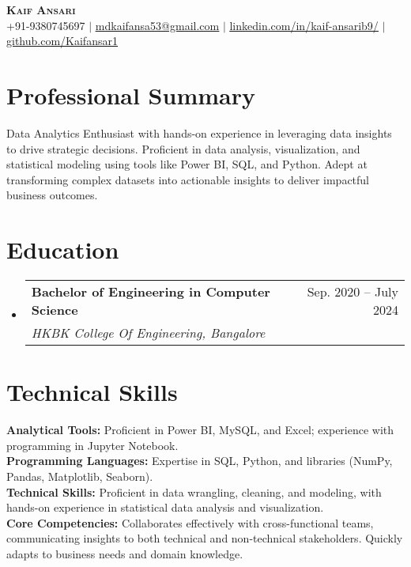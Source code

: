 \documentclass[letterpaper,11pt]{article}
\makeatletter
\newcommand{\resumeSubheading}[4]{
  \vspace{-2pt}\item
    \begin{tabular*}{0.97\textwidth}[t]{l@{\extracolsep{\fill}}r}
      \textbf{#1} & #2 \\
      \textit{\small#3} & \textit{\small #4} \\
    \end{tabular*}\vspace{-7pt}
}
\newcommand{\resumeSubHeadingListStart}{\begin{itemize}[leftmargin=0.15in, label={}]}
\newcommand{\resumeSubHeadingListEnd}{\end{itemize}}
\makeatother
\begin{document}
\begin{center}
    \textbf{\Huge \scshape Kaif Ansari} \\ \vspace{1pt}
    \small +91-9380745697 $|$ \href{mailto:mdkaifansa53@gmail.com}{\underline{mdkaifansa53@gmail.com}} $|$ 
    \href{https://www.linkedin.com/in/kaif-ansarib9/}{\underline{linkedin.com/in/kaif-ansarib9/}} $|$
    \href{https://github.com/Kaifansar1?tab=repositories}{\underline{github.com/Kaifansar1}}
\end{center}

\section{Professional Summary}
\small{Data Analytics Enthusiast with hands-on experience in leveraging data insights to drive strategic decisions. Proficient in data analysis, visualization, and statistical modeling using tools like Power BI, SQL, and Python. Adept at transforming complex datasets into actionable insights to deliver impactful business outcomes.}

\section{Education}
\resumeSubHeadingListStart
  \resumeSubheading
    {Bachelor of Engineering in Computer Science}{Sep. 2020 -- July 2024}
    {HKBK College Of Engineering, Bangalore}{}
\resumeSubHeadingListEnd

\section{Technical Skills}
\begin{itemize}[leftmargin=0.15in, label={}]
  \small{\item{
   \textbf{Analytical Tools:} Proficient in Power BI, MySQL, and Excel; experience with programming in Jupyter Notebook. \\
   \textbf{Programming Languages:} Expertise in SQL, Python, and libraries (NumPy, Pandas, Matplotlib, Seaborn). \\
   \textbf{Technical Skills:} Proficient in data wrangling, cleaning, and modeling, with hands-on experience in statistical data analysis and visualization. \\
   \textbf{Core Competencies:} Collaborates effectively with cross-functional teams, communicating insights to both technical and non-technical stakeholders. Quickly adapts to business needs and domain knowledge.}}
\end{itemize}
\end{document}
